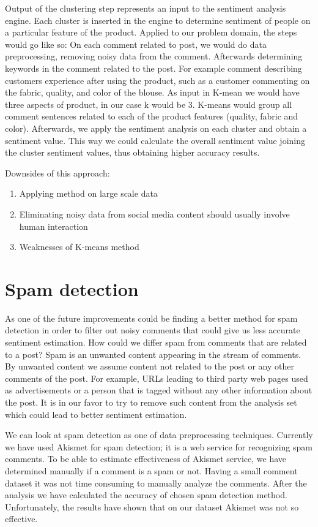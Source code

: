 Output of the clustering step represents an input to the sentiment analysis engine. Each cluster is inserted in the engine to determine sentiment of people on a particular feature of the product.
Applied to our problem domain, the steps would go like so:
On each comment related to post, we would do data preprocessing, removing noisy data from the comment. Afterwards determining keywords in the comment related to the post. For example comment describing customers experience after using the product, such as a customer commenting on the fabric, quality, and color of the blouse. As input in K-mean we would have three aspects of product, in our case k would be 3. K-means would group all comment sentences related to each of the product features (quality, fabric and color). Afterwards, we apply the sentiment analysis on each cluster and obtain a sentiment value. This way we could calculate the overall sentiment value joining the cluster sentiment values, thus obtaining higher accuracy results.

Downsides of this approach:
\begin{enumerate}
	\item Applying method on large scale data
	\item Eliminating noisy data from social media content should usually involve human interaction
	\item Weaknesses of K-means method
\end{enumerate}

\section{Spam detection}

As one of the future improvements could be finding a better method for spam detection in order to filter out noisy comments that could give us less accurate sentiment estimation.  How could we differ spam from comments that are related to a post? Spam is an unwanted content appearing in the stream of comments. By unwanted content we assume content not related to the post or any other comments of the post. For example, URLs leading to third party web pages used as advertisements or a person that is tagged without any other information about the post. It is in our favor to try to remove such content from the analysis set which could lead to better sentiment estimation. 

We can look at spam detection as one of data preprocessing techniques. Currently we have used Akismet for spam detection; it is a web service for recognizing spam comments. To be able to estimate effectiveness of Akismet service, we have determined manually if a comment is a spam or not. Having a small comment dataset it was not time consuming to manually analyze the comments. After the analysis we have calculated the accuracy of chosen spam detection method. Unfortunately, the results have shown that on our dataset Akismet was not so effective.

